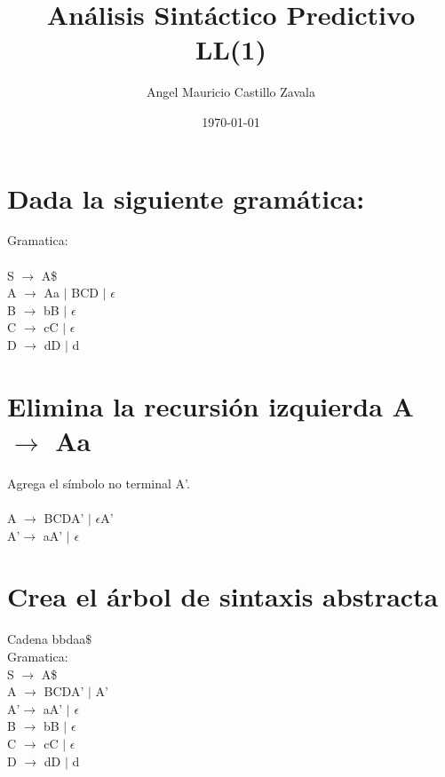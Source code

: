 \documentclass[10pt]{article}
\title{Análisis Sintáctico Predictivo LL(1)}
\author{Angel Mauricio Castillo Zavala}
\date{\small{\today}}
\begin{document}
\maketitle

\section{Dada la siguiente gramática: }
Gramatica: \\\\
    S {$\rightarrow$} A\$ \\
	A {$\rightarrow$}  Aa $\mid$ BCD $\mid$ $\epsilon$ \\
	B {$\rightarrow$} bB $\mid$ $\epsilon$ \\
	C {$\rightarrow$} cC $\mid$ $\epsilon$\\
	D {$\rightarrow$} dD $\mid$ d

\section{Elimina la recursión izquierda A $\rightarrow$ Aa}
Agrega el símbolo no terminal A’.\\\\
           A $\rightarrow$ BCDA' $\mid$ $\epsilon$A'\\
          A’$\rightarrow$ aA' $\mid$ $\epsilon$ \\

\section{Crea el árbol de sintaxis abstracta}    
Cadena bbdaa$\$$\\
Gramatica:\\
S {$\rightarrow$} A\$ \\
A $\rightarrow$ BCDA' $\mid$ A'\\
A’$\rightarrow$ aA' $\mid$ $\epsilon$ \\
B {$\rightarrow$} bB $\mid$ $\epsilon$ \\
C {$\rightarrow$} cC $\mid$ $\epsilon$ \\
D {$\rightarrow$} dD $\mid$ d\\\\
\end{document}
